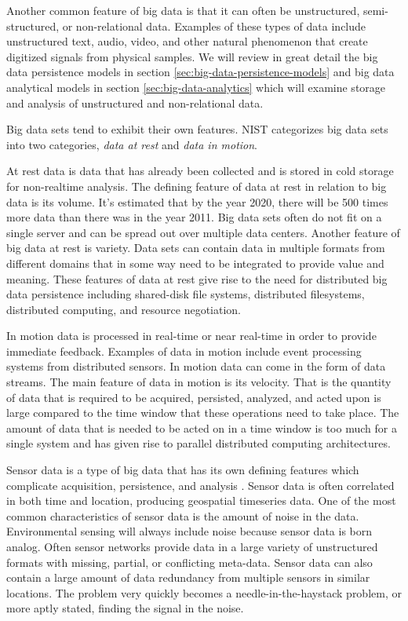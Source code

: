\documentclass[]{article}
\begin{document}
Another common feature of big data is that it can often be unstructured, semi-structured, or non-relational data. Examples of these types of data include unstructured text, audio, video, and other natural phenomenon that create digitized signals from physical samples. We will review in great detail the big data persistence models in section \ref{sec:big-data-persistence-models} and big data analytical models in section \ref{sec:big-data-analytics} which will examine storage and analysis of unstructured and non-relational data. 

Big data sets tend to exhibit their own features. NIST categorizes big data sets into two categories, \textit{data at rest} and \textit{data in motion}. 

At rest data is data that has already been collected and is stored in cold storage for  non-realtime analysis. The defining feature of data at rest in relation to big data is its volume. It's estimated that by the year 2020, there will be 500 times more data than there was in the year 2011. Big data sets often do not fit on a single server and can be spread out over multiple data centers. Another feature of big data at rest is variety. Data sets can contain data in multiple formats from different domains that in some way need to be integrated to provide value and meaning.  These features of data at rest give rise to the need for distributed big data persistence including shared-disk file systems, distributed filesystems, distributed computing, and resource negotiation.  

In motion data is processed in real-time or near real-time in order to provide immediate feedback. Examples of data in motion include event processing systems from distributed sensors. In motion data can come in the form of data streams. The main feature of data in motion is its velocity. That is the quantity of data that is required to be acquired, persisted, analyzed, and acted upon is large compared to the time window that these operations need to take place. The amount of data that is needed to be acted on in a time window is too much for a single system and has given rise to parallel distributed computing architectures.

Sensor data is a type of big data that has its own defining features which complicate acquisition, persistence, and analysis \cite{chen_big_2014}. Sensor data is often correlated in both time and location, producing geospatial timeseries data. One of the most common characteristics of sensor data is the amount of noise in the data. Environmental sensing will always include noise because sensor data is born analog\cite{pcast}. Often sensor networks provide data in a large variety of unstructured formats with missing, partial, or conflicting meta-data. Sensor data can also contain a large amount of data redundancy from multiple sensors in similar locations. The problem very quickly becomes a needle-in-the-haystack problem, or more aptly stated, finding the signal in the noise.
\end{document}
